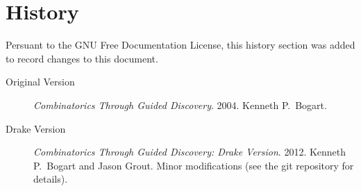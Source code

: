 \chapter{History}

Persuant to the GNU Free Documentation License, this history section was added to record changes to this document.

\begin{description}
\item[Original Version] {\it Combinatorics Through Guided Discovery}. 2004. Kenneth P.~Bogart.
\item[Drake Version] {\it Combinatorics Through Guided Discovery: Drake Version}. 2012. Kenneth P.~Bogart and Jason Grout. Minor modifications (see the git repository for details).
\end{description}
